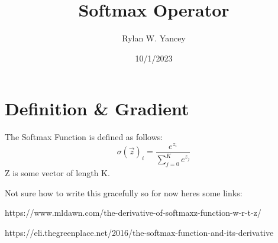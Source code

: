 \documentclass{article}
\title{Softmax Operator}
\author{Rylan W. Yancey}
\date{10/1/2023}
\begin{document}
    \maketitle
    \section*{Definition \& Gradient}
        The Softmax Function is defined as follows:
        $$\sigma(\vec z)_i = \frac{e^{z_i}}{\sum_{j=0}^{K} e^{z_j}}$$
        Z is some vector of length K. 

        Not sure how to write this gracefully so for now heres some links:

        https://www.mldawn.com/the-derivative-of-softmaxz-function-w-r-t-z/
        
        https://eli.thegreenplace.net/2016/the-softmax-function-and-its-derivative
\end{document}
